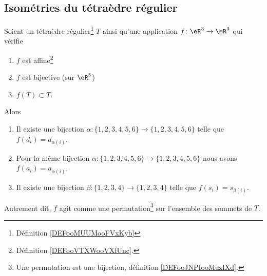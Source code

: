 \subsection{Isométries du tétraèdre régulier}

\begin{proposition}     \label{PROPooHTBIooTJQNZt}
	Soient un tétraèdre régulier\footnote{Définition \ref{DEFooMUUMooFVxKyb}} \( T\) ainsi qu'une application \( f\colon \eR^3\to \eR^3\) qui vérifie
	\begin{enumerate}
		\item
		      \( f\) est affine\footnote{Définition \ref{DEFooVTXWooVXfUnc}.}
		\item
		      \( f\) est bijective (sur \( \eR^3\))
		\item
		      \( f(T)\subset T\).
	\end{enumerate}
	Alors
	\begin{enumerate}
		\item       \label{ITEMooGAVPooVPESod}
		      Il existe une bijection \( \alpha\colon \{ 1,2,3,4,5,6 \}\to \{ 1,2,3,4,5,6 \}\) telle que \( f(d_i)=d_{\alpha(i)}\).
		\item       \label{ITEMooWRINooTlmXyI}
		      Pour la même bijection \( \alpha\colon \{ 1,2,3,4,5,6 \}\to \{ 1,2,3,4,5,6 \}\) nous avons \( f(a_i)=a_{\alpha(i)}\).
		\item       \label{ITEMooGPNPooZiEoLk}
		      Il existe une bijection \( \beta\colon \{ 1,2,3,4 \}\to \{ 1,2,3,4 \}\) telle que \( f(s_i)=s_{\beta(i)}\).
	\end{enumerate}
	Autrement dit, \( f\) agit comme une permutation\footnote{Une permutation est une bijection, définition \ref{DEFooJNPIooMuzIXd}.} sur l'ensemble des sommets de \( T\).
\end{proposition}

